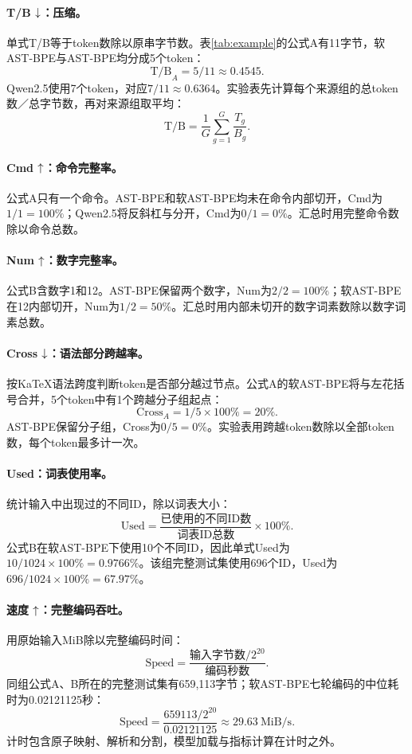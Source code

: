 \paragraph{T/B $\downarrow$：压缩。}
单式T/B等于token数除以原串字节数。表\ref{tab:example}的公式A有11字节，软AST-BPE与AST-BPE均分成5个token：
\[\mathrm{T/B}_A=5/11\approx0.4545.\]
Qwen2.5使用7个token，对应$7/11\approx0.6364$。实验表先计算每个来源组的总token数／总字节数，再对来源组取平均：
\[\mathrm{T/B}=\frac{1}{G}\sum_{g=1}^G\frac{T_g}{B_g}.\]

\paragraph{Cmd $\uparrow$：命令完整率。}
公式A只有一个命令\code{\frac}。AST-BPE和软AST-BPE均未在命令内部切开，Cmd为$1/1=100\%$；Qwen2.5将反斜杠与分开，Cmd为$0/1=0\%$。汇总时用完整命令数除以命令总数。

\paragraph{Num $\uparrow$：数字完整率。}
公式B含数字1和12。AST-BPE保留两个数字，Num为$2/2=100\%$；软AST-BPE在12内部切开，Num为$1/2=50\%$。汇总时用内部未切开的数字词素数除以数字词素总数。

\paragraph{Cross $\downarrow$：语法部分跨越率。}
按KaTeX语法跨度判断token是否部分越过节点。公式A的软AST-BPE将\code{\frac}与左花括号合并，5个token中有1个跨越分子组起点：
\[\mathrm{Cross}_A=1/5\times100\%=20\%.\]
AST-BPE保留分子组，Cross为$0/5=0\%$。实验表用跨越token数除以全部token数，每个token最多计一次。

\paragraph{Used：词表使用率。}
统计输入中出现过的不同ID，除以词表大小：
\[\mathrm{Used}=\frac{\text{已使用的不同ID数}}{\text{词表ID总数}}\times100\%.\]
公式B在软AST-BPE下使用10个不同ID，因此单式Used为$10/1024\times100\%=0.9766\%$。该组完整测试集使用696个ID，Used为$696/1024\times100\%=67.97\%$。
\paragraph{速度 $\uparrow$：完整编码吞吐。}
用原始输入MiB除以完整编码时间：
\[\mathrm{Speed}=\frac{\text{输入字节数}/2^{20}}{\text{编码秒数}}.\]
同组公式A、B所在的完整测试集有659,113字节；软AST-BPE七轮编码的中位耗时为0.02121125秒：
\[\mathrm{Speed}=\frac{659113/2^{20}}{0.02121125}\approx29.63\ \mathrm{MiB/s}.\]
计时包含原子映射、解析和分割，模型加载与指标计算在计时之外。
